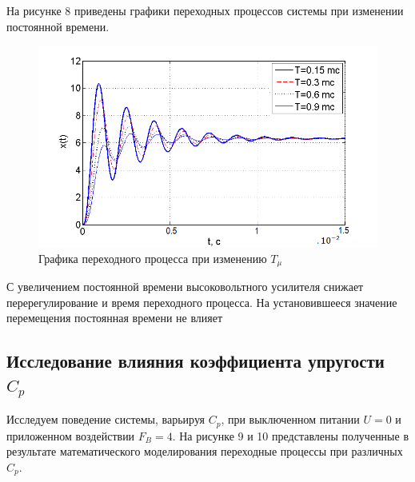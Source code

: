 \documentclass[a4paper, 12pt]{article}
\begin{document}
На рисунке 8 приведены графики переходных процессов системы при изменении постоянной времени.
\begin{figure}[h]
	\centering
	\includegraphics[width=0.9\linewidth]{8}
	\caption{Графика переходного процесса при изменению $T_{\mu}$}
	\label{}
\end{figure}

С увеличением постоянной времени высоковольтного усилителя снижает перерегулирование и время переходного процесса. На установившееся значение перемещения постоянная времени не влияет

\newpage
\begin{center}
	\section{Исследование влияния коэффициента упругости $C_p$}
\end{center} \par
Исследуем поведение системы, варьируя $C_p$, при выключенном питании $U = 0$ и приложенном воздействии $F_B = 4$. На рисунке 9 и 10 представлены полученные в результате математического моделирования переходные процессы при различных $C_p$.
\end{document}
